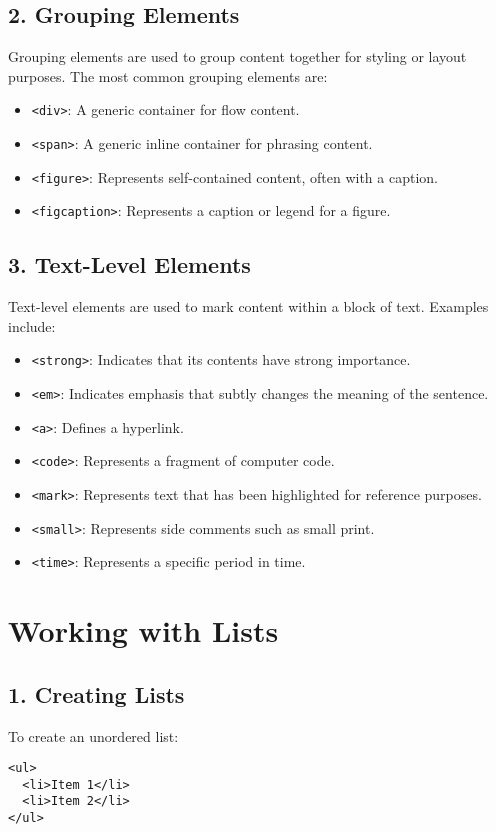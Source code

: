 \documentclass{article}
\begin{document}
\subsection*{2. Grouping Elements}
Grouping elements are used to group content together for styling or layout purposes. The most common grouping elements are:
\begin{itemize}
    \item \texttt{<div>}: A generic container for flow content.
    \item \texttt{<span>}: A generic inline container for phrasing content.
    \item \texttt{<figure>}: Represents self-contained content, often with a caption.
    \item \texttt{<figcaption>}: Represents a caption or legend for a figure.
\end{itemize}

\subsection*{3. Text-Level Elements}
Text-level elements are used to mark content within a block of text. Examples include:
\begin{itemize}
    \item \texttt{<strong>}: Indicates that its contents have strong importance.
    \item \texttt{<em>}: Indicates emphasis that subtly changes the meaning of the sentence.
    \item \texttt{<a>}: Defines a hyperlink.
    \item \texttt{<code>}: Represents a fragment of computer code.
    \item \texttt{<mark>}: Represents text that has been highlighted for reference purposes.
    \item \texttt{<small>}: Represents side comments such as small print.
    \item \texttt{<time>}: Represents a specific period in time.
\end{itemize}

\section{Working with Lists}
\subsection*{1. Creating Lists}
To create an unordered list:
\begin{lstlisting}
<ul>
  <li>Item 1</li>
  <li>Item 2</li>
</ul>
\end{lstlisting}
\end{document}
